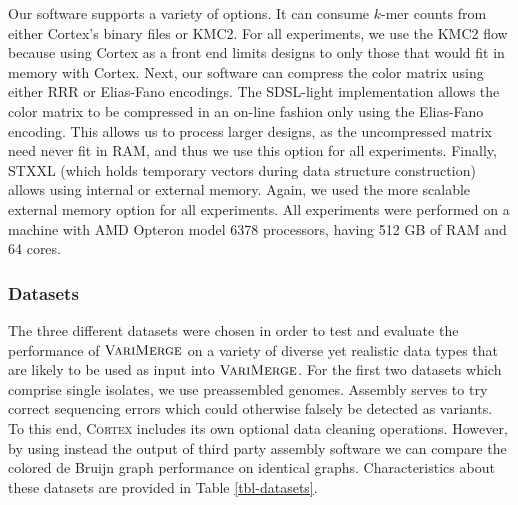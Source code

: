 Our software supports a variety of options.  It can consume $k$-mer counts from either Cortex's binary files or KMC2.  For all experiments, we use the KMC2 flow because using Cortex as a front end limits designs to only those that would fit in memory with Cortex.  Next, our software can compress the color matrix using either RRR or Elias-Fano encodings.  The SDSL-light implementation allows the color matrix to be compressed in an on-line fashion only using the Elias-Fano encoding.  This allows us to process larger designs, as the uncompressed matrix need never fit in RAM, and thus we use this option for all experiments.  Finally, STXXL (which holds temporary vectors during data structure construction) allows using internal or external memory.  Again, we used the more scalable external memory option for all experiments.
All experiments were performed on a machine with AMD Opteron model 6378 processors, having 512 GB of RAM and 64 cores.




\subsubsection{Datasets}
\label{data}



The three different datasets were chosen in order to test and evaluate the performance of $\mbox{\rm {\sc VariMerge}}$ on a variety of diverse yet realistic data types that are likely to be used as input into $\mbox{\rm {\sc VariMerge}}$.  For the first two datasets which comprise single isolates, we use preassembled genomes.  Assembly serves to try correct sequencing errors which could otherwise falsely be detected as variants. To this end, \textsc{Cortex} includes its own optional data cleaning operations.  However, by using instead the output of third party assembly software we can compare the colored de Bruijn graph performance on identical graphs.  Characteristics about these datasets are provided in Table \ref{tbl-datasets}.



